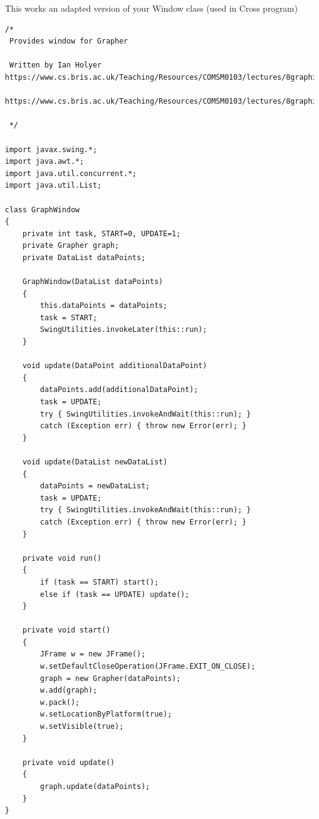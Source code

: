 \documentclass[11pt]{article} %
\begin{document}
This works an adapted version of your Window class (used in Cross program) 
\begin{lstlisting}
/*
 Provides window for Grapher
 
 Written by Ian Holyer https://www.cs.bris.ac.uk/Teaching/Resources/COMSM0103/lectures/8graphics/
        https://www.cs.bris.ac.uk/Teaching/Resources/COMSM0103/lectures/8graphics/Window.java
 
 */

import javax.swing.*;
import java.awt.*;
import java.util.concurrent.*;
import java.util.List;

class GraphWindow
{
    private int task, START=0, UPDATE=1;
    private Grapher graph;
    private DataList dataPoints;
    
    GraphWindow(DataList dataPoints)
    {
        this.dataPoints = dataPoints;
        task = START;
        SwingUtilities.invokeLater(this::run);
    }

    void update(DataPoint additionalDataPoint)
    {
        dataPoints.add(additionalDataPoint);
        task = UPDATE;
        try { SwingUtilities.invokeAndWait(this::run); }
        catch (Exception err) { throw new Error(err); }
    }
    
    void update(DataList newDataList)
    {
        dataPoints = newDataList;
        task = UPDATE;
        try { SwingUtilities.invokeAndWait(this::run); }
        catch (Exception err) { throw new Error(err); }
    }

    private void run()
    {
        if (task == START) start();
        else if (task == UPDATE) update();
    }

    private void start()
    {
        JFrame w = new JFrame();
        w.setDefaultCloseOperation(JFrame.EXIT_ON_CLOSE);
        graph = new Grapher(dataPoints);
        w.add(graph);
        w.pack();
        w.setLocationByPlatform(true);
        w.setVisible(true);
    }

    private void update()
    {
        graph.update(dataPoints);
    }
}
\end{lstlisting}
\end{document}
